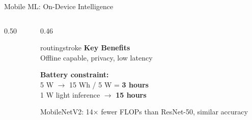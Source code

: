 \documentclass[aspectratio=169, 12pt]{beamer}
\begin{document}
\begin{frame}{Mobile ML: On-Device Intelligence}
\begin{columns}[T]
\begin{column}{0.50\textwidth}
    \vspace{0.1cm}
  \end{column}
  \begin{column}{0.46\textwidth}
    \vspace{0.1cm}
    \begin{mlsyscard}{routingstroke}
    \textbf{Key Benefits}\\
    Offline capable, privacy, low latency
    \end{mlsyscard}

    \vspace{0.1cm}
    \textbf{Battery constraint:}\\
    5 W $\to$ 15 Wh / 5 W = \textbf{3 hours}\\
    1 W light inference $\to$ \textbf{15 hours}

    \vspace{0.1cm}
    MobileNetV2: 14$\times$ fewer FLOPs than ResNet-50, similar accuracy
  \end{column}
\end{columns}

\end{frame}
\end{document}
